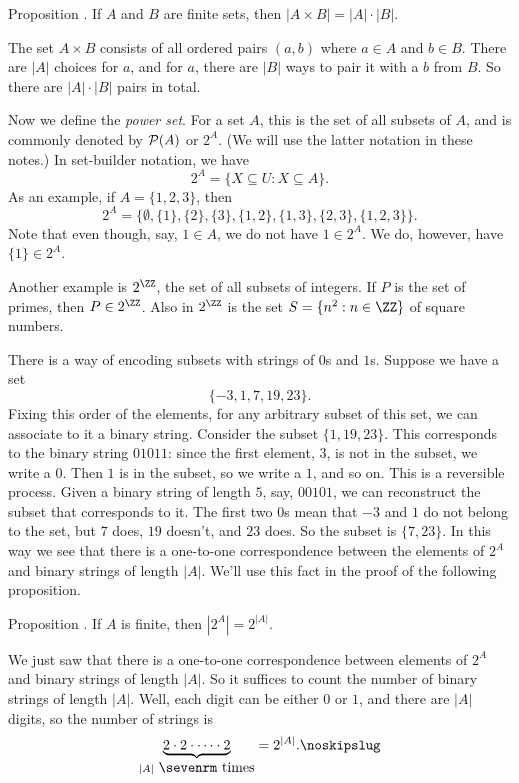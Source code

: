 \proclaim Proposition \advthm. If $A$ and $B$ are finite sets, then $|A\times B| = |A|\cdot |B|$.

\proof The set $A\times B$ consists of all ordered pairs $(a,b)$ where $a\in A$ and $b\in B$. There are
$|A|$ choices for $a$, and for $a$, there are $|B|$ ways to pair it with a $b$ from $B$. So there
are $|A|\cdot |B|$ pairs in total.\slug

Now we define the {\it power set}. For a set $A$, this is the set of all subsets of $A$, and is
commonly denoted by ${\cal P}(A)$ or $2^A$. (We will use the latter notation in these notes.)
In set-builder notation, we have
$$2^A = \{X\subseteq U : X\subseteq A\}.$$
As an example, if $A = \{1,2,3\}$, then
$$2^A = \bigl\{\emptyset, \{1\}, \{2\}, \{3\}, \{1,2\}, \{1,3\}, \{2,3\}, \{1,2,3\}\bigr\}.$$
Note that even though, say, $1\in A$, we do not have $1\in 2^A$. We do, however, have $\{1\}\in 2^A$.

Another example is $2^\ZZ$, the set of all subsets of integers. If $P$ is the set of primes, then
$P\in 2^\ZZ$. Also in $2^\ZZ$ is the set $S = \{n^2 : n\in \ZZ\}$ of square numbers.

There is a way of encoding subsets with strings of $0$s and $1$s. Suppose we have a set
$$\{-3, 1, 7, 19, 23\}.$$
Fixing this order of the elements, for any arbitrary subset of this set, we can associate to it a binary string.
Consider the subset $\{1, 19, 23\}$. This corresponds to the binary string $01011$: since the first element,
$3$, is not in the subset, we write a $0$. Then $1$ is in the subset, so we write a $1$, and so on.
This is a reversible process. Given a binary string of length $5$, say, $00101$, we can reconstruct the
subset that corresponds to it. The first two $0$s mean that $-3$ and $1$ do not belong to the set,
but $7$ does, $19$ doesn't, and $23$ does. So the subset is $\{7, 23\}$. In this way we see that there
is a one-to-one correspondence between the elements of $2^A$ and binary strings of length $|A|$.
We'll use this fact in the proof of the following proposition.

\edef\propcardpowerset{\the\thmcount}
\proclaim Proposition \advthm. If $A$ is finite, then
$|2^A| = 2^{|A|}$.

\proof We just saw that there is a one-to-one correspondence between elements of $2^A$ and binary strings
of length $|A|$. So it suffices to count the number of binary strings of length $|A|$. Well, each digit
can be either $0$ or $1$, and there are $|A|$ digits, so the number of strings is
$$\underbrace{2\cdot 2\cdot \cdots \cdot 2}_{|A|\ \hbox{\sevenrm times}} = 2^{|A|}.\noskipslug$$

